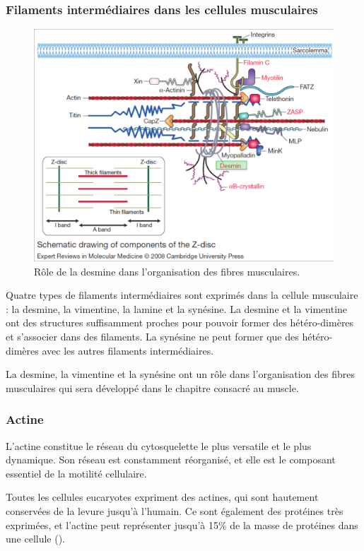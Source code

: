 \subsubsection{Filaments intermédiaires dans les cellules musculaires}
\begin{figure}
\includegraphics[scale=0.15]{sarcomere.png}
\caption{Rôle de la desmine dans l'organisation des fibres musculaires.}
\end{figure}
Quatre types de filaments intermédiaires sont exprimés dans la cellule musculaire : la desmine, la vimentine, la lamine et la synésine. 
La desmine et la vimentine ont des structures suffisamment proches pour pouvoir former des hétéro-dimères et s'associer dans des filaments. La synésine ne peut former que des hétéro-dimères avec les autres filaments intermédiaires. 

La desmine, la vimentine et la synésine ont un rôle dans l'organisation des fibres musculaires qui sera développé dans le chapitre consacré au muscle. 



\subsubsection{Actine}
  
L'actine constitue le réseau du cytosquelette le plus versatile et le plus dynamique. Son réseau est constamment réorganisé, et elle est le composant essentiel de la motilité cellulaire. 

Toutes les cellules eucaryotes expriment des actines, qui sont hautement conservées de la levure jusqu'à l'humain. Ce sont également des protéines très exprimées, et l'actine peut représenter jusqu'à 15\% de la masse de protéines dans une cellule (\cite{alberts_molecular_2002}).

